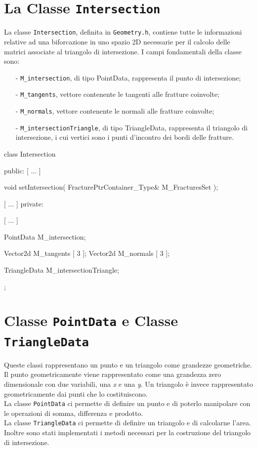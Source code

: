\section{La Classe \texttt{Intersection}}

La classe \texttt{Intersection}, definita in \texttt{Geometry.h}, contiene tutte le informazioni relative ad una biforcazione in uno spazio 2D necessarie per il calcolo delle matrici associate al triangolo di intersezione.
I campi fondamentali della classe sono:
	\begin{enumerate}
	\item[-] \texttt{M\_intersection}, di tipo PointData, rappresenta il punto di intersezione;
	\item[-] \texttt{M\_tangents}, vettore contenente le tangenti alle fratture coinvolte;
	\item[-] \texttt{M\_normals}, vettore contenente le normali alle fratture coinvolte;
	\item[-] \texttt{M\_intersectionTriangle}, di tipo TriangleData, rappresenta il triangolo di intersezione, i cui vertici sono i punti d'incontro dei bordi delle fratture.
	\end{enumerate} 

\begin{Code03_03}[caption={Classe \texttt{Intersection}}]
class Intersection
{
 public:
	[ ... ]
	
	void setIntersection( FracturePtrContainer_Type& M_FracturesSet );
	
	[ ... ]
 private:
	
	[ ... ]	
	
	PointData M_intersection;
	
	Vector2d M_tangents [ 3 ];
	Vector2d M_normals [ 3 ];
	
	TriangleData M_intersectionTriangle;
};	
\end{Code03_03}

\section{Classe \texttt{PointData} e Classe \texttt{TriangleData}}
Queste classi rappresentano un punto e un triangolo come grandezze geometriche.
Il punto geometricamente viene rappresentato come una grandezza zero dimensionale con due variabili, una \textit{x} e una \textit{y}.
Un triangolo è invece  rappresentato geometricamente dai punti che lo costituiscono.\\
\noindent La classe \texttt{PointData} ci permette di definire un punto e di poterlo manipolare con le operazioni di somma, differenza e prodotto.\\
\noindent La classe \texttt{TriangleData} ci permette di definire un triangolo e di calcolarne l'area. Inoltre sono stati implementati i metodi necessari per la costruzione del triangolo di intersezione.
